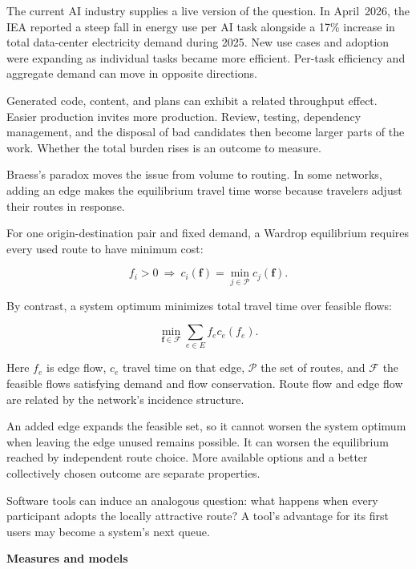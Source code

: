 \documentclass[11pt,openany]{book}
\newcommand{\subhead}[1]{\par\medskip\noindent\textbf{#1}\par\nobreak\smallskip}
\begin{document}
The current AI industry supplies a live version of the question. In April~2026, the IEA reported a steep fall in energy use per AI task alongside a 17\% increase in total data-center electricity demand during 2025. New use cases and adoption were expanding as individual tasks became more efficient.\cite{iea2026questions} Per-task efficiency and aggregate demand can move in opposite directions.

Generated code, content, and plans can exhibit a related throughput effect. Easier production invites more production. Review, testing, dependency management, and the disposal of bad candidates then become larger parts of the work. Whether the total burden rises is an outcome to measure.

Braess's paradox moves the issue from volume to routing. In some networks, adding an edge makes the equilibrium travel time worse because travelers adjust their routes in response.\cite{braess1968}

For one origin-destination pair and fixed demand, a Wardrop equilibrium requires every used route to have minimum cost:

\begin{equation}
f_i>0\ \Longrightarrow\
c_i(\mathbf f)=\min_{j\in\mathcal P}c_j(\mathbf f).
\end{equation}

By contrast, a system optimum minimizes total travel time over feasible flows:

\begin{equation}
\min_{\mathbf f\in\mathcal F}
\sum_{e\in E}f_e c_e(f_e).
\end{equation}

Here $f_e$ is edge flow, $c_e$ travel time on that edge, $\mathcal P$ the set of routes, and $\mathcal F$ the feasible flows satisfying demand and flow conservation. Route flow and edge flow are related by the network's incidence structure.

An added edge expands the feasible set, so it cannot worsen the system optimum when leaving the edge unused remains possible. It can worsen the equilibrium reached by independent route choice. More available options and a better collectively chosen outcome are separate properties.

Software tools can induce an analogous question: what happens when every participant adopts the locally attractive route? A tool's advantage for its first users may become a system's next queue.

\subhead{Measures and models}
\end{document}
